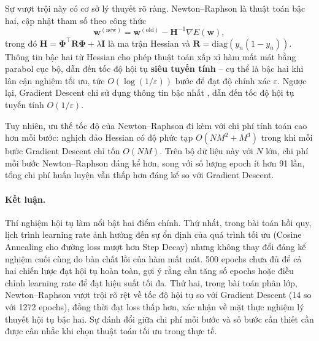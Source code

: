 Sự vượt trội này có cơ sở lý thuyết rõ ràng.
Newton--Raphson là thuật toán bậc hai, cập nhật tham số theo công thức
\begin{equation}
    \mathbf{w}^{(\text{new})} = \mathbf{w}^{(\text{old})} - \mathbf{H}^{-1}\nabla E(\mathbf{w}),
    \label{eq:newton_update}
\end{equation}
trong đó $\mathbf{H} = \boldsymbol{\Phi}^\top\mathbf{R}\boldsymbol{\Phi} + \lambda\mathbf{I}$
là ma trận Hessian và $\mathbf{R} = \mathrm{diag}(y_n(1-y_n))$.
Thông tin bậc hai từ Hessian cho phép thuật toán xấp xỉ hàm mất mát
bằng parabol cục bộ, dẫn đến tốc độ hội tụ \textbf{siêu tuyến tính}
 -- cụ thể là bậc hai 
khi lân cận nghiệm tối ưu, tức $O(\log(1/\varepsilon))$ bước
để đạt độ chính xác $\varepsilon$.
Ngược lại, Gradient Descent chỉ sử dụng thông tin bậc nhất ,
dẫn đến tốc độ hội tụ tuyến tính  $O(1/\varepsilon)$.

Tuy nhiên, ưu thế tốc độ của Newton--Raphson đi kèm với chi phí tính toán
cao hơn mỗi bước: nghịch đảo Hessian có độ phức tạp $O(NM^2 + M^3)$
trong khi mỗi bước Gradient Descent chỉ tốn $O(NM)$.
Trên bộ dữ liệu này với $N$ lớn, chi phí mỗi bước Newton--Raphson
đáng kể hơn, song với số lượng epoch ít hơn 91 lần,
tổng chi phí huấn luyện vẫn thấp hơn đáng kể so với Gradient Descent.

\paragraph{Kết luận.}
Thí nghiệm hội tụ làm nổi bật hai điểm chính.
Thứ nhất, trong bài toán hồi quy,
lịch trình learning rate ảnh hưởng đến sự ổn định của quá trình tối ưu
(Cosine Annealing cho đường loss mượt hơn Step Decay)
nhưng không thay đổi đáng kể nghiệm cuối cùng do bản chất lồi của hàm mất mát.
500 epochs chưa đủ để cả hai chiến lược đạt hội tụ hoàn toàn,
gợi ý rằng cần tăng số epochs hoặc điều chỉnh learning rate
để đạt hiệu suất tối đa.
Thứ hai, trong bài toán phân lớp,
Newton--Raphson vượt trội rõ rệt về tốc độ hội tụ so với Gradient Descent
(14 so với 1272 epochs), đồng thời đạt loss thấp hơn,
xác nhận về mặt thực nghiệm lý thuyết hội tụ bậc hai.
Sự đánh đổi giữa chi phí mỗi bước và số bước cần thiết
cần được cân nhắc khi chọn thuật toán tối ưu trong thực tế.

\clearpage